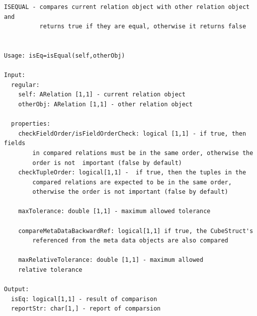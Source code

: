 \documentclass[letterpaper,10pt,english]{sphinxmanual}
\begin{document}
\begin{Verbatim}[commandchars=\\\{\}]
ISEQUAL - compares current relation object with other relation object and
          returns true if they are equal, otherwise it returns false


Usage: isEq=isEqual(self,otherObj)

Input:
  regular:
    self: ARelation [1,1] - current relation object
    otherObj: ARelation [1,1] - other relation object

  properties:
    checkFieldOrder/isFieldOrderCheck: logical [1,1] - if true, then fields
        in compared relations must be in the same order, otherwise the
        order is not  important (false by default)
    checkTupleOrder: logical[1,1] -  if true, then the tuples in the
        compared relations are expected to be in the same order,
        otherwise the order is not important (false by default)

    maxTolerance: double [1,1] - maximum allowed tolerance

    compareMetaDataBackwardRef: logical[1,1] if true, the CubeStruct's
        referenced from the meta data objects are also compared

    maxRelativeTolerance: double [1,1] - maximum allowed
    relative tolerance

Output:
  isEq: logical[1,1] - result of comparison
  reportStr: char[1,] - report of comparsion
\end{Verbatim}
\end{document}

